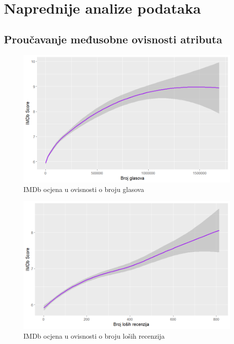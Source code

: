 \chapter{Naprednije analize podataka}

	\section{Proučavanje međusobne ovisnosti atributa}
	
	\begin{figure}[H]
		\centering
		\includegraphics[width=15cm]{../figures/lucija_slozeni/glasoviocjena.png}
		\caption{IMDb ocjena u ovisnosti o broju glasova}
		\label{napredni1}
	\end{figure}
	
	\begin{figure}[H]
		\centering
		\includegraphics[width=15cm]{../figures/lucija_slozeni/loseocjena.png}
		\caption{IMDb ocjena u ovisnosti o broju loših recenzija}
		\label{napredni2}
	\end{figure}
	
